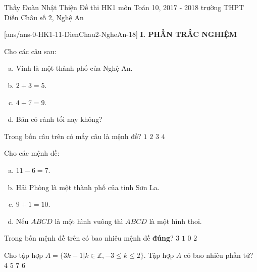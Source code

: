 	\begin{name}
		{Thầy Đoàn Nhật Thiện}
		{Đề thi HK1 môn Toán 10, 2017 - 2018 trường THPT Diễn Châu số 2, Nghệ An}
	\end{name}
	\setcounter{ex}{0}\setcounter{bt}{0}
	[ans/ans-0-HK1-11-DienChau2-NgheAn-18]
\noindent\textbf{I. PHẦN TRẮC NGHIỆM}
\begin{ex}%
	Cho các câu sau:
	\begin{enumerate}[a)]
		\item Vinh là một thành phố của Nghệ An.
		\item $2+3=5$.
		\item $4+7=9$.
		\item Bản có rảnh tối nay không?
	\end{enumerate}
Trong bốn câu trên có mấy câu là mệnh đề?
\choice
{$1$}
{$2$}
{\True $3$}
{$4$}
\end{ex}

\begin{ex}%
	Cho các mệnh đề:
	\begin{enumerate}[a)]
		\item $11-6=7$.
		\item Hải Phòng là một thành phố của tỉnh Sơn La.
		\item $9+1=10$.
		\item Nếu $ABCD$ là một hình vuông thì $ABCD$ là một hình thoi.
	\end{enumerate}
Trong bốn mệnh đề trên có bao nhiêu mệnh đề \textbf{đúng}?
\choice
{$3$}
{$1$}
{$0$}
{\True $2$}
\end{ex}

\begin{ex}%
	Cho tập hợp $A=\{3k-1|k\in\mathbb{Z},-3\le k\le 2\}$. Tập hợp $A$ có bao nhiêu phần tử?
	\choice
	{$4$}
	{$5$}
	{$7$}
	{\True $6$}
\end{ex}


